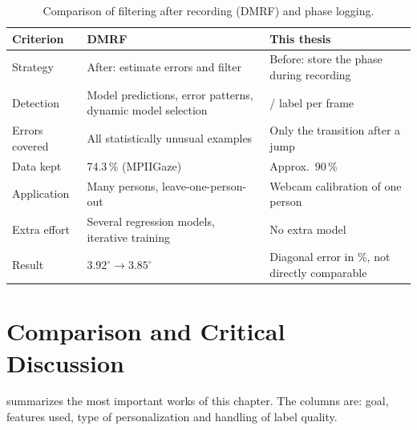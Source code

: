 \begin{table}[htbp]
  \centering
  \small
  \caption{Comparison of filtering after recording (DMRF) and phase logging.}
  \label{tab:dmrf_vergleich}
  \begin{tabularx}{\textwidth}{L{3.0cm} Y Y}
    \toprule
    \textbf{Criterion} & \textbf{DMRF~\cite{jiang2026dmrf}} & \textbf{This thesis} \\
    \midrule
    Strategy & After: estimate errors and filter & Before: store the phase during recording \\
    Detection & Model predictions, error patterns, dynamic model selection & / label per frame \\
    Errors covered & All statistically unusual examples & Only the transition after a jump \\
    Data kept & 74.3\,\% (MPIIGaze) & Approx.\ 90\,\% \\
    Application & Many persons, leave-one-person-out & Webcam calibration of one person \\
    Extra effort & Several regression models, iterative training & No extra model \\
    Result & $3.92^\circ \rightarrow 3.85^\circ$ & Diagonal error in \%, not directly comparable \\
    \bottomrule
  \end{tabularx}
\end{table}

\section{Comparison and Critical Discussion}
\label{sec:vergleich}
 summarizes the most important works of this chapter.
The columns are: goal, features used, type of personalization and handling of
label quality.

